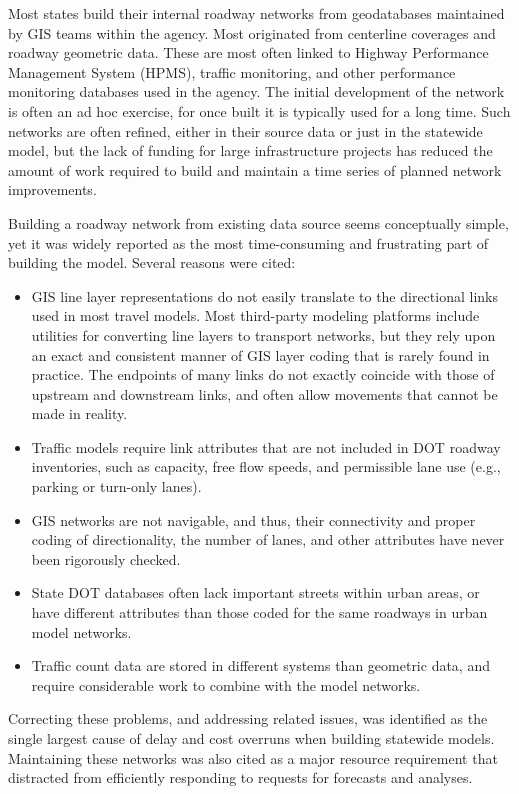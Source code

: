 Most states build their internal roadway networks from geodatabases maintained by GIS teams within the agency. Most originated from centerline coverages and roadway geometric data. These are most often linked to Highway Performance Management System (HPMS), traffic monitoring, and other performance monitoring databases used in the agency. The initial development of the network is often an ad hoc exercise, for once built it is typically used for a long time. Such networks are often refined, either in their source data or just in the statewide model, but the lack of funding for large infrastructure projects has reduced the amount of work required to build and maintain a time series of planned network improvements.

Building a roadway network from existing data source seems conceptually simple, yet it was widely reported as the most time-consuming and frustrating part of building the model. Several reasons were cited:

\begin{itemize}
\item
GIS line layer representations do not easily translate to the directional links used in most travel models. Most third-party modeling platforms include utilities for converting line layers to transport networks, but they rely upon an exact and consistent manner of GIS layer coding that is rarely found in practice. The endpoints of many links do not exactly coincide with those of upstream and downstream links, and often allow movements that cannot be made in reality.
\item
Traffic models require link attributes that are not included in DOT roadway inventories, such as capacity, free flow speeds, and permissible lane use (e.g., parking or turn-only lanes).
\item
GIS networks are not navigable, and thus, their connectivity and proper coding of directionality, the number of lanes, and other attributes have never been rigorously checked.
\item
State DOT databases often lack important streets within urban areas, or have different attributes than those coded for the same roadways in urban model networks.
\item
Traffic count data are stored in different systems than geometric data, and require considerable work to combine with the model networks.
\end{itemize}

Correcting these problems, and addressing related issues, was identified as the single largest cause of delay and cost overruns when building statewide models. Maintaining these networks was also cited as a major resource requirement that distracted from efficiently responding to requests for forecasts and analyses.

